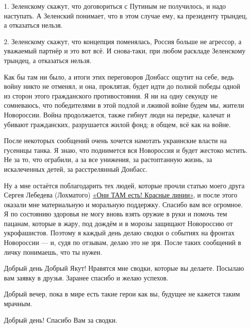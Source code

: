 1. Зеленскому скажут, что договориться с Путиным не получилось, и надо
наступать. А Зеленский понимает, что в этом случае ему, ка президенту трындец,
а отказаться нельзя.

2. Зеленскому скажут, что концепция поменялась, Россия больше не агрессор, а
уважаемый партнёр и это вот всё. И снова-таки, при любом раскладе Зеленскому
трындец, а отказаться нельзя. 

Как бы там ни было, а итоги этих переговоров Донбасс ощутит на себе, ведь войну
никто не отменял, и она, проклятая, будет идти до полной победы одной из сторон
этого гражданского противостояния. Я ни на одну секунду не сомневаюсь, что
победителями в этой подлой и лживой войне будем мы, жители Новороссии. Война
продолжается, также гибнут люди на передке, калечат и убивают гражданских,
разрушается жилой фонд; в общем, всё как на войне. 

После некоторых сообщений очень хочется намотать украинские власти на гусеницы
танка. Я знаю, что поднимется вся Новороссия и будет жестоко мстить. Не за то,
что ограбили, а за все унижения, за растоптанную жизнь, за искалеченных детей,
за расстрелянный Донбасс. 

Ну а мне остаётся поблагодарить тех людей, которые прочли статью моего друга
Сергея Лебедева (Лохматого)
\href{https://voskhodinfo.su/okazat-pomosch-lyudyam/pomosch-semyam/73136-oni-tam-est-krasnye-linii.html}{«Они %
ТАМ есть! Красные линии»}, и после этого оказали мне материальную и моральную
поддержку. Спасибо вам все огромное. Я по состоянию здоровья не могу вновь
взять оружие в руки и помочь тем пацанам, которые в жару, под дождём и в морозы
защищают Новороссию от укрофашистов.  Поэтому я каждый день делаю сводки о
событиях на фронтах Новороссии — и, судя по отзывам, делаю это не зря. После
таких сообщений в личку понимаешь, что ты нужен. 

Добрый день Добрый Якут! Нравятся мне сводки, которые вы делаете. Посылаю вам
заявку в друзья. Заранее спасибо и желаю успехов.

Добрый вечер, пока в мире есть такие герои как вы, будущее не кажется таким
мрачным.

Добрый день! Спасибо Вам за сводки.
